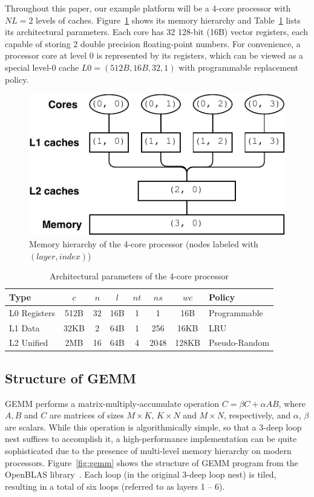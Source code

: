 Throughout this paper, our example platform will be
a 4-core processor with
$NL=2$ levels of caches.
Figure~\ref{fig:hierarchy} shows its memory hierarchy 
and Table~\ref{tab:cluster} lists its
architectural parameters. 
Each core has 32 128-bit (16B) vector registers,
each capable of storing 2 double precision floating-point numbers.
For convenience, a processor core at level 0
is represented by its registers, which can be viewed as a special
level-0 cache $L0 = (512B, 16B, 32, 1)$ with programmable replacement policy.

\begin{figure}
  \centering
  \includegraphics[width=.45\textwidth]{figures/cluster-new}
  \caption{Memory hierarchy of the 4-core processor
    (nodes labeled with $(layer,index)$)}
  \label{fig:hierarchy}
\end{figure}

\begin{table}
  \centering
  \caption{Architectural parameters of the 4-core processor}
  \label{tab:cluster}
  \begin{tabular}{lccccccl}
    \toprule
    Type & $c$ & $n$ & $l$ & $nt$ & $ns$ & $wc$ & Policy \\
    \midrule
    L0 Registers  & 512B & 32 & 16B & 1 & 1 & 16B & Programmable \\
    L1 Data    & 32KB & 2  & 64B & 1 & 256 & 16KB & LRU \\
    L2 Unified & 2MB  & 16 & 64B & 4 & 2048 & 128KB & Pseudo-Random \\
    \bottomrule
  \end{tabular}
\end{table}

\subsection{Structure of GEMM}\label{subsec:gemm}

GEMM performs a matrix-multiply-accumulate operation $C = \beta C + \alpha A B$,
where $A, B$ and $C$ are matrices of sizes
$M \times K$, $K \times N$ and $M \times N$, respectively,
and $\alpha$, $\beta$ are scalars.
While this operation is algorithmically simple,
so that a 3-deep loop nest suffices to accomplish it,
a high-performance implementation can be quite
sophisticated due to the presence of multi-level memory
hierarchy on modern processors.
Figure~\ref{fig:gemm} shows the structure of GEMM program from
the OpenBLAS library~\cite{openblas}.
Each loop (in the original 3-deep loop nest) is tiled,
resulting in a total of six loops (referred to as layers 1 -- 6).

